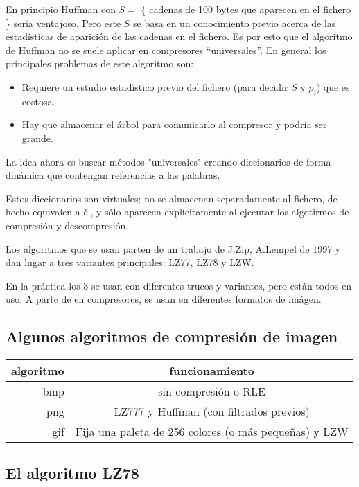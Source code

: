 	En principio Huffman con $S =$ \{ cadenas de 100 bytes que aparecen en el fichero \} sería ventajoso. Pero este $S$ se basa en un conocimiento previo acerca de las estadísticas de aparición de las cadenas en el fichero. Es por esto que el algoritmo de Huffman no se suele aplicar en compresores ``universales''. En general los principales problemas de este algoritmo son:

	\begin{itemize}
		\item Requiere un estudio estadístico previo del fichero (para decidir $S$ y $p_i$) que es costosa.

		\item Hay que almacenar el árbol para comunicarlo al compresor y podría ser grande.

	\end{itemize}
La idea ahora es buscar métodos "universales" creando diccionarios de forma dinámica que contengan referencias a las palabras.

Estos diccionarios son virtuales; no se almacenan separadamente al fichero, de hecho equivalen a él, y sólo aparecen explícitamente al ejecutar los algotirmos de compresión y descompresión.


	Los algoritmos que se usan parten de un trabajo de J.Zip, A.Lempel de 1997 y dan lugar a tres variantes principales: LZ77, LZ78 y LZW.

	En la práctica los 3 se usan con diferentes trucos y variantes, pero están todos en uso. A parte de en compresores, se usan en diferentes formatos de imágen.
	\newpage
	\subsection{Algunos algoritmos de compresión de imagen}
	\begin{center}
		\begin{table}[h]
			\centering
			\begin{tabular}{r|c}
			algoritmo & funcionamiento \\ \hline
			bmp & sin compresión o RLE \\
			png & LZ777 y Huffman (con filtrados previos) \\
			gif & Fija una paleta de 256 colores (o más pequeñas) y LZW \\
			\end{tabular}
		\end{table}
	\end{center}

	\subsection{El algoritmo LZ78}


